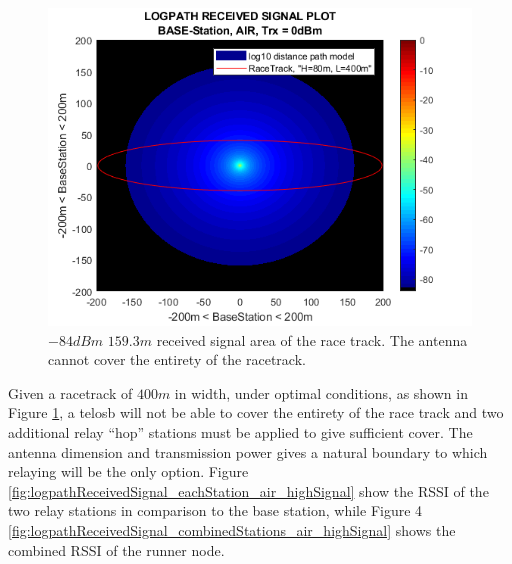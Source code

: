 \begin{figure}[H]
	\centering
	\includegraphics[width=\linewidth]{theory/pathLoss/fig/logpathReceivedSignal_baseStation_air_highSignal.png}
	\caption{$-84dBm$ $159.3m$ received signal area of the race track. The antenna cannot cover the entirety of the racetrack.}
	\label{fig:logpathReceivedSignal_baseStation_air_highSignal}
\end{figure}


Given a racetrack of $400m$ in width, under optimal conditions, as shown in Figure \ref{fig:logpathReceivedSignal_baseStation_air_highSignal}, a telosb will not be able to cover the entirety of the race track and two additional relay “hop” stations must be applied to give sufficient cover. The antenna dimension and transmission power gives a natural boundary to which relaying will be the only option. Figure \ref{fig:logpathReceivedSignal_eachStation_air_highSignal} show the RSSI of the two relay stations in comparison to the base station, while Figure 4 \ref{fig:logpathReceivedSignal_combinedStations_air_highSignal} shows the combined RSSI of the runner node.

